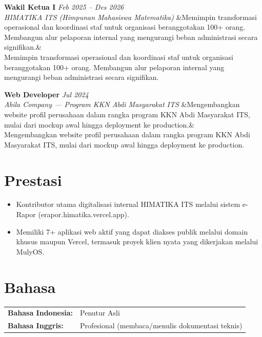 \documentclass[a4paper,11pt]{article}
\newcommand{\cventry}[4]{%
  \noindent\textbf{#1} \hfill \textit{#3} \\
  \textit{#2}
  \ifx&#4& \else \\ \small #4 \fi
  \vspace{6pt}
}
\begin{document}
\cventry
  {Wakil Ketua I}
  {HIMATIKA ITS (Himpunan Mahasiswa Matematika)}
  {Feb 2025 -- Des 2026}
  {Memimpin transformasi operasional dan koordinasi staf untuk organisasi beranggotakan 100+ orang. Membangun alur pelaporan internal yang mengurangi beban administrasi secara signifikan.}

\cventry
  {Web Developer}
  {Abila Company --- Program KKN Abdi Masyarakat ITS}
  {Jul 2024}
  {Mengembangkan website profil perusahaan dalam rangka program KKN Abdi Masyarakat ITS, mulai dari mockup awal hingga deployment ke production.}

\section{Prestasi}
\begin{itemize}[leftmargin=15pt, nosep]
  \item Kontributor utama digitalisasi internal HIMATIKA ITS melalui sistem e-Rapor (erapor.himatika.vercel.app).
  \item Memiliki 7+ aplikasi web aktif yang dapat diakses publik melalui domain khusus maupun Vercel, termasuk proyek klien nyata yang dikerjakan melalui MulyOS.
\end{itemize}

\section{Bahasa}
\begin{tabularx}{\textwidth}{@{}l l@{}}
\textbf{Bahasa Indonesia:} & Penutur Asli \\
\textbf{Bahasa Inggris:} & Profesional (membaca/menulis dokumentasi teknis) \\
\end{tabularx}
\end{document}
